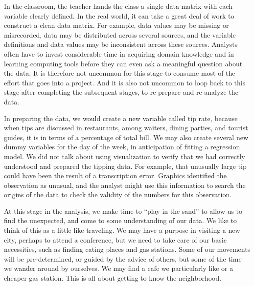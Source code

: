 \vspace{1em}

 In the classroom, the teacher hands
the class a single data matrix with each variable clearly defined.  In
the real world, it can take a great deal of work to construct a clean
data matrix.  For example, data values may be missing or misrecorded,
data may be distributed across several sources, and the variable
definitions and data values may be inconsistent across these sources.
Analysts often have to invest considerable time in acquiring domain
knowledge and in learning computing tools before they can even ask a
meaningful question about the data.  It is therefore not uncommon for
this stage to consume most of the effort that goes into a project. And
it is also not uncommon to loop back to this stage after completing
the subsequent stages, to re-prepare and re-analyze the data.

In preparing the  data, we would create a new variable called
tip rate, because when tips are discussed in restaurants, among
waiters, dining parties, and tourist guides, it is in terms of a
percentage of total bill. We may also create several new dummy
variables for the day of the week, in anticipation of fitting a
regression model. We did not talk about using visualization to verify
that we had correctly understood and prepared the tipping data.  For
example, that unusually large tip could have been the result of a
transcription error. Graphics identified the observation as unusual,
and the analyst might use this information to search the origins of
the data to check the validity of the numbers for this observation.

\vspace{1em}

At this stage in the analysis, we make time to ``play in the sand'' to
allow us to find the unexpected, and come to some understanding of our
data. We like to think of this as a little like traveling. We may have
a purpose in visiting a new city, perhaps to attend a conference, but
we need to take care of our basic necessities, such as finding eating
places and gas stations.  Some of our movements will be
pre-determined, or guided by the advice of others, but some of the
time we wander around by ourselves. We may find a cafe we particularly
like or a cheaper gas station.  This is all about getting to know the
neighborhood.

